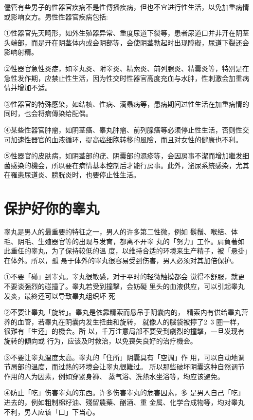 \documentclass[12pt,UTF8]{ctexbook}
\begin{document}
儘管有些男子的性器官疾病不是性傳播疾病，但也不宜进行性生活，以免加重病情或影响女方。男性性器官疾病包括:

①性器官先天畸形，如外生殖器异常、重度尿道下裂等，患者尿道口并非开在阴茎头端部，而是开在阴茎体内或会阴部等，会使阴茎勃起时出现障礙，尿道下裂还会影响射精。

②性器官急性炎症，如睾丸炎、附睾炎、精索炎、前列腺炎、精囊炎等，特別是在急性发作期，应禁止性生活，因为性交时性器官高度充血与水肿，性刺激会加重病情并增加不适。

③性器官的特殊感染，如结核、性病、滴蟲病等，患病期间过性生活在加重病情的同时，也会将病傳染给配偶。

④某些性器官肿瘤，如阴茎癌、睾丸肿瘤、前列腺癌等必须停止性生活，否则性交可加速性器官的血液循环，提高癌细胞转移的風險，而且对女性的健康也不利。

⑤性器官的皮肤病，如阴茎部的疣、阴囊部的濕疹等，会因房事不潔而增加繼发细菌感染的機会，所以要在病情基本控制后才能行房事。此外，泌尿系統感染，尤其在罹患尿道炎、膀胱炎时，也要停止性生活。

\section{保护好你的睾丸}

睾丸是男人的最重要的特征之一，男人的许多第二性微，例如
鬍鬚、喉结、体毛、阴毛、生殖器官等的出现与发育，都离不开睾
丸的「努力」工作。肩負著如此重任的睾丸，为了保持较低的温
度，以维持合适的环境来生产精子，被「悬掛」在体外。所以，孤
悬于体外的睾丸很容易受到伤害，男人必须对其加倍保护。

①不要「碰」到睾丸。睾丸很敏感，对于平时的轻微触摸都会
觉得不舒服，就更不要谈强烈的碰撞了。睾丸若受到撞擊，会妨礙
里头的血液供应，可以引起睾丸发炎，最終还可以导致睾丸组织坏
死

②不要让睾丸「旋转」。睾丸是依靠精索而悬吊于阴囊内的，
精索内有供给睾丸营养的血管，若睾丸在阴囊内发生扭曲和旋转，
就像人的腦袋被擰了2~3 圈一样，很難有「生还」的機会。所
以，千万注意局部不要受到劇烈的撞擊，一旦发现有旋转的傾向或
行为，应该及时救治，以免喪失良好的治疗機会。

③不要让睾丸温度太高。睾丸的「住所」阴囊具有「空调」作
用，可以自动地调节局部的温度，而过熱的环境会让睾丸很難过。
所以那些破坏阴囊这种自然调节作用的人为因素，例如穿紧身褲、
蒸气浴、洗熱水坐浴等，均应该避免。

④防止「吃」伤害睾丸的东西。许多伤害睾丸的危害因素，多
是男人自己「吃」进去的，例如粗制棉籽油、殘留農藥、酗酒、重
金属、化学合成物等，均对睾丸不利，男人应该「口」下当心。
\end{document}

